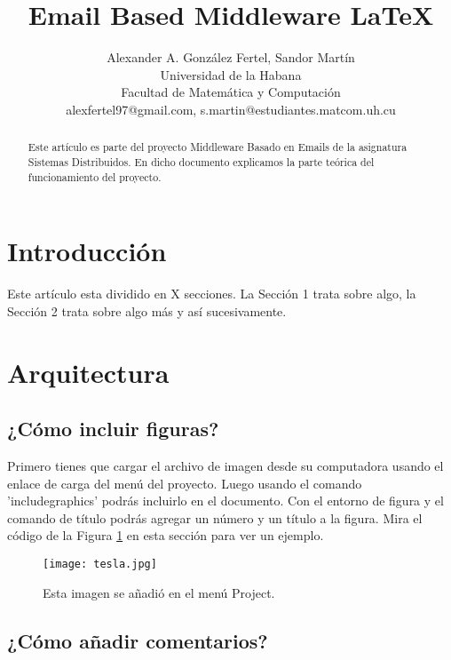 \documentclass[a4paper]{article}
\title{Email Based Middleware \LaTeX}
\author{Alexander A. González Fertel, Sandor Martín \\
  \small Universidad de la Habana\\
  \small Facultad de Matemática y Computación\\
  \small alexfertel97@gmail.com, s.martin@estudiantes.matcom.uh.cu
  \date{}
}
\begin{document}
\maketitle

\begin{abstract}
	
Este artículo es parte del proyecto Middleware Basado en Emails de la asignatura Sistemas Distribuidos.
En dicho documento explicamos la parte teórica del funcionamiento del proyecto.

\end{abstract}

\section{Introducci\'on}

Este artículo esta dividido en X secciones. La Sección 1 trata sobre algo, la Sección 2 trata sobre algo más y así sucesivamente.

\section{Arquitectura}

\subsection{¿Cómo incluir figuras?}

Primero tienes que cargar el archivo de imagen desde su computadora usando el enlace de carga del menú del proyecto. Luego usando el comando 'includegraphics' podrás incluirlo en el documento. Con el entorno de figura y el comando de título podrás agregar un número y un título a la figura. Mira el código de la Figura \ref{fig:tesla} en esta sección para ver un ejemplo.

\begin{figure}
\centering
\texttt{[image: tesla.jpg]}
\caption{\label{fig:tesla}Esta imagen se añadió en el menú Project.}
\end{figure}


\subsection{¿Cómo añadir comentarios?}
% 
% 
% 
\end{document}
